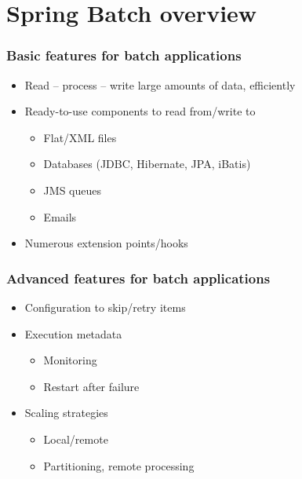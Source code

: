 \section{Spring Batch overview}

\begin{frame}
\frametitle{Basic features for batch applications}
\begin{itemize}
	\item Read – process – write large amounts of data, efficiently
	\item Ready-to-use components to read from/write to
	\begin{itemize}
		\item Flat/XML files
		\item Databases (JDBC, Hibernate, JPA, iBatis)
		\item JMS queues
		\item Emails
	\end{itemize}
	\item Numerous extension points/hooks	
\end{itemize}

\end{frame}

\begin{frame}
 \frametitle{Advanced features for batch applications}
 \begin{itemize}
  \item Configuration to skip/retry items
  \item Execution metadata
   \begin{itemize}
     \item Monitoring
     \item Restart after failure
   \end{itemize}
  \item Scaling strategies
   \begin{itemize}
     \item Local/remote
     \item Partitioning, remote processing
   \end{itemize}
\end{itemize}
\end{frame}

